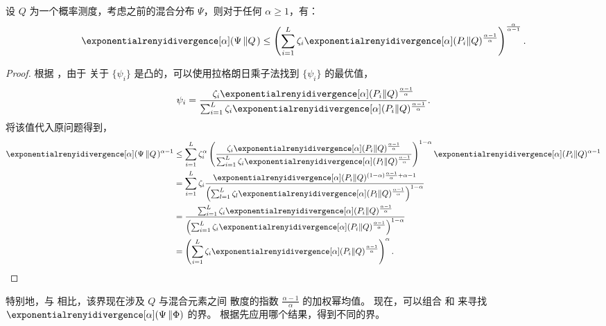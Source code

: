 \begin{prop}
\label{pp:mix_psi}
    设 $Q$ 为一个概率测度，考虑之前的混合分布 $\Psi$，则对于任何 $\alpha\geq1$，有：
    \begin{align*}
        \exponentialrenyidivergence[\alpha](\Psi\left\Vert Q\right.) \leq \left(\sum_{i=1}^L \zeta_i \exponentialrenyidivergence[\alpha](P_i\Vert Q)^{\frac{\alpha-1}{\alpha}}\right)^{\frac{\alpha}{\alpha-1}}.
    \end{align*}
\end{prop}
\begin{proof}
    根据 \cite{papini2019optimistic}，由于  关于 $\{\psi_i\}$ 是凸的，可以使用拉格朗日乘子法找到 $\{\psi_i\}$ 的最优值，
    \begin{align*}
        \psi_i = \frac{\zeta_i \exponentialrenyidivergence[\alpha](P_i \Vert Q)^{\frac{\alpha-1}{\alpha}}}{\sum_{i=1}^L \zeta_i \exponentialrenyidivergence[\alpha](P_i\Vert Q)^{\frac{\alpha-1}{\alpha}}}.
    \end{align*}
    将该值代入原问题得到，
    \begin{align*}
        \exponentialrenyidivergence[\alpha](\Psi\left\Vert Q\right.)^{\alpha-1}
        &\leq \sum_{i=1}^L \zeta_i^\alpha \left(\frac{\zeta_i \exponentialrenyidivergence[\alpha](P_i \Vert Q)^{\frac{\alpha-1}{\alpha}}}{\sum_{i=1}^L \zeta_i \exponentialrenyidivergence[\alpha](P_l\Vert Q)^{\frac{\alpha-1}{\alpha}}} \right)^{1-\alpha} \exponentialrenyidivergence[\alpha](P_i \Vert Q)^{\alpha-1}
        \\
        &= \sum_{i=1}^L \zeta_i\frac{ \exponentialrenyidivergence[\alpha](P_i \Vert Q)^{(1-\alpha)\frac{\alpha-1}{\alpha} +\alpha-1}}{\left(\sum_{l=1}^L \zeta_l \exponentialrenyidivergence[\alpha](P_l\Vert Q)^{\frac{\alpha-1}{\alpha}}\right)^{1-\alpha}}
        \\
        &= \frac{\sum_{i=1}^L \zeta_i \exponentialrenyidivergence[\alpha](P_i \Vert Q)^{\frac{\alpha-1}{\alpha} }}{\left(\sum_{i=1}^L \zeta_i \exponentialrenyidivergence[\alpha](P_i\Vert Q)^{\frac{\alpha-1}{\alpha}}\right)^{1-\alpha}}
        \\
        &= \left(\sum_{i=1}^L \zeta_i \exponentialrenyidivergence[\alpha](P_i\Vert Q)^{\frac{\alpha-1}{\alpha}}\right)^{\alpha}.
    \end{align*}
\end{proof}

特别地，与  相比，该界现在涉及 $Q$ 与混合元素之间 \Renyi 散度的指数 $\textstyle\frac{\alpha-1}{\alpha}$ 的加权幂均值。
现在，可以组合  和  来寻找 $\exponentialrenyidivergence[\alpha](\Psi\left\Vert\Phi\right)$ 的界。
根据先应用哪个结果，得到不同的界。


